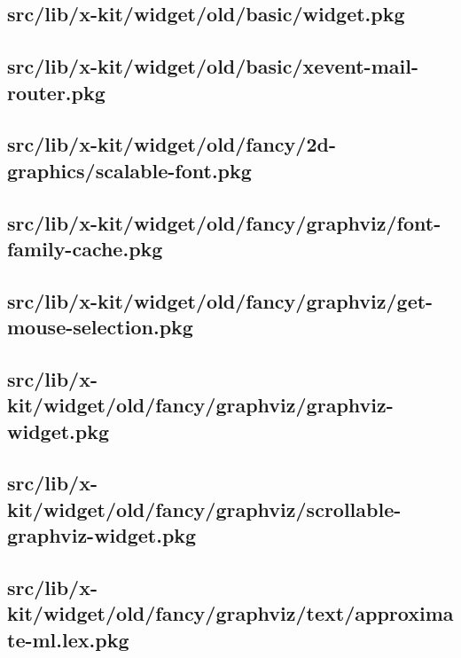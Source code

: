 \subsection{src/lib/x-kit/widget/old/basic/widget.pkg}


\subsection{src/lib/x-kit/widget/old/basic/xevent-mail-router.pkg}


\subsection{src/lib/x-kit/widget/old/fancy/2d-graphics/scalable-font.pkg}


\subsection{src/lib/x-kit/widget/old/fancy/graphviz/font-family-cache.pkg}


\subsection{src/lib/x-kit/widget/old/fancy/graphviz/get-mouse-selection.pkg}


\subsection{src/lib/x-kit/widget/old/fancy/graphviz/graphviz-widget.pkg}


\subsection{src/lib/x-kit/widget/old/fancy/graphviz/scrollable-graphviz-widget.pkg}


\subsection{src/lib/x-kit/widget/old/fancy/graphviz/text/approximate-ml.lex.pkg}


